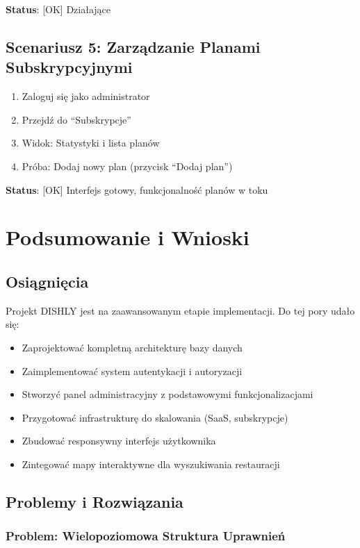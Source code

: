 \documentclass[12pt,a4paper,utf-8]{article}
\begin{document}
\textbf{Status}: [OK] Działające

\subsection{Scenariusz 5: Zarządzanie Planami Subskrypcyjnymi}

\begin{enumerate}
    \item Zaloguj się jako administrator
    \item Przejdź do ``Subskrypcje''
    \item Widok: Statystyki i lista planów
    \item Próba: Dodaj nowy plan (przycisk ``Dodaj plan'')
\end{enumerate}

\textbf{Status}: [OK] Interfejs gotowy, funkcjonalność planów w toku

\newpage

\section{Podsumowanie i Wnioski}

\subsection{Osiągnięcia}

Projekt DISHLY jest na zaawansowanym etapie implementacji. Do tej pory udało się:

\begin{itemize}
    \item Zaprojektować kompletną architekturę bazy danych
    \item Zaimplementować system autentykacji i autoryzacji
    \item Stworzyć panel administracyjny z podstawowymi funkcjonalizacjami
    \item Przygotować infrastrukturę do skalowania (SaaS, subskrypcje)
    \item Zbudować responsywny interfejs użytkownika
    \item Zintegować mapy interaktywne dla wyszukiwania restauracji
\end{itemize}

\subsection{Problemy i Rozwiązania}

\subsubsection{Problem: Wielopoziomowa Struktura Uprawnień}
\end{document}

